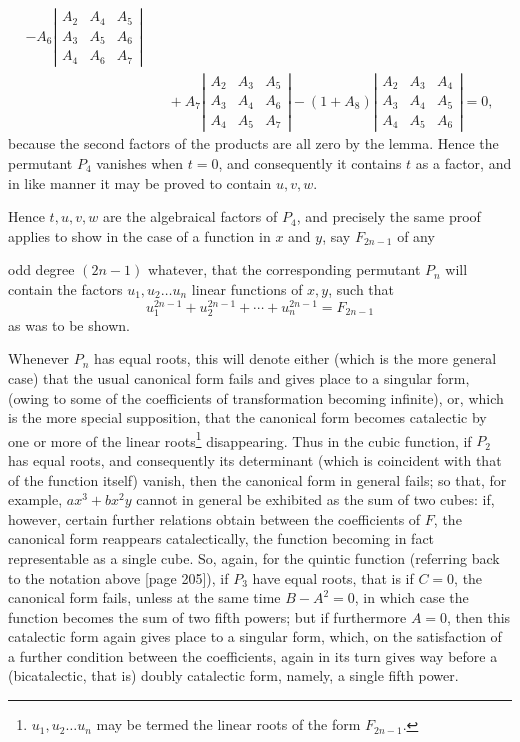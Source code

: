 \documentclass[11pt]{article}
\newcommand{\sourcepage}[1]{\marginpar{\scriptsize p.~#1}}
\begin{document}
{{\[\begin{aligned}
-A_6\left|\begin{array}{ccc}A_2&A_4&A_5\\A_3&A_5&A_6\\A_4&A_6&A_7\end{array}\right|\\
&\quad
+A_7\left|\begin{array}{ccc}A_2&A_3&A_5\\A_3&A_4&A_6\\A_4&A_5&A_7\end{array}\right|
-(1+A_8)\left|\begin{array}{ccc}A_2&A_3&A_4\\A_3&A_4&A_5\\A_4&A_5&A_6\end{array}\right|=0,
\end{aligned}
\]
because the second factors of the products are all zero by the lemma. Hence the permutant $P_4$ vanishes when $t=0$, and consequently it contains $t$ as a factor, and in like manner it may be proved to contain $u,v,w$.

Hence $t,u,v,w$ are the algebraical factors of $P_4$, and precisely the same proof applies to show in the case of a function in $x$ and $y$, say $F_{2n-1}$ of any

\sourcepage{211}
odd degree $(2n-1)$ whatever, that the corresponding permutant $P_n$ will contain the factors $u_1,u_2\ldots u_n$ linear functions of $x,y$, such that
\[
 u_1^{2n-1}+u_2^{2n-1}+\cdots+u_n^{2n-1}=F_{2n-1}
\]
as was to be shown.

Whenever $P_n$ has equal roots, this will denote either (which is the more general case) that the usual canonical form fails and gives place to a singular form, (owing to some of the coefficients of transformation becoming infinite), or, which is the more special supposition, that the canonical form becomes catalectic by one or more of the linear roots\footnote{$u_1,u_2\ldots u_n$ may be termed the linear roots of the form $F_{2n-1}$.} disappearing. Thus in the cubic function, if $P_2$ has equal roots, and consequently its determinant (which is coincident with that of the function itself) vanish, then the canonical form in general fails; so that, for example, $ax^3+bx^2y$ cannot in general be exhibited as the sum of two cubes: if, however, certain further relations obtain between the coefficients of $F$, the canonical form reappears catalectically, the function becoming in fact representable as a single cube. So, again, for the quintic function (referring back to the notation above [page 205]), if $P_3$ have equal roots, that is if $C=0$, the canonical form fails, unless at the same time $B-A^2=0$, in which case the function becomes the sum of two fifth powers; but if furthermore $A=0$, then this catalectic form again gives place to a singular form, which, on the satisfaction of a further condition between the coefficients, again in its turn gives way before a (bicatalectic, that is) doubly catalectic form, namely, a single fifth power.

}}
\end{document}
